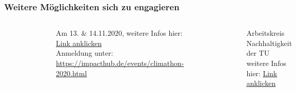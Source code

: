 \begin{frame}
  \frametitle{Weitere Möglichkeiten sich zu engagieren}
  \begin{columns}
    \begin{figure}
      \centering
      \includegraphics[width=\textwidth]{bilder/climate-kic-logo.pdf}
    \end{figure}
    Am 13. \& 14.11.2020, weitere Infos hier: \href{https://cet.tu-dortmund.de/veranstaltungen/detail/climathon-germany-4770/}{Link anklicken}\\
    Anmeldung unter:\\
    \url{https://impacthub.de/events/climathon-2020.html}
    \begin{figure}
      \centering
      \includegraphics[width=\textwidth]{bilder/akn-tu.jpg}
    \end{figure}
    Arbeitskreis Nachhaltigkeit der TU\\
    weitere Infos hier: \href{https://www.tu-dortmund.de/universitaet/nachhaltigkeit/}{Link anklicken}
  \end{columns}



\end{frame}
